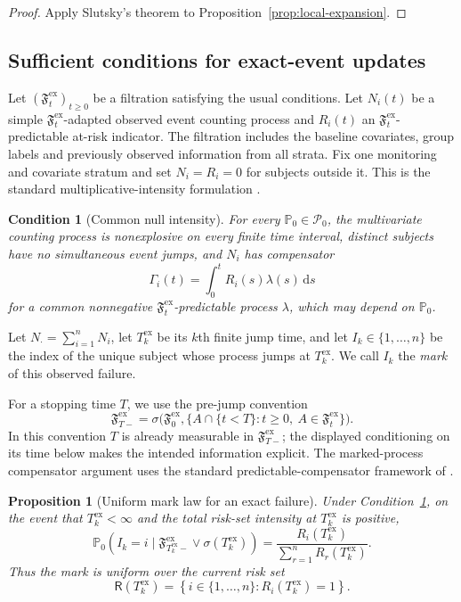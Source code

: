 \documentclass[12pt]{article}
\newtheorem{proposition}[theorem]{Proposition}
\newtheorem{condition}[theorem]{Condition}
\theoremstyle{definition}
\theoremstyle{remark}
\begin{document}
\begin{proof}
Apply Slutsky's theorem to Proposition~\ref{prop:local-expansion}.
\end{proof}

\subsection{Sufficient conditions for exact-event updates}

Let $(\mathfrak F_t^{\mathrm{ex}})_{t\geq0}$ be a filtration satisfying the usual conditions. Let $N_i(t)$ be a simple $\mathfrak F_t^{\mathrm{ex}}$-adapted observed event counting process and $R_i(t)$ an $\mathfrak F_t^{\mathrm{ex}}$-predictable at-risk indicator. The filtration includes the baseline covariates, group labels and previously observed information from all strata. Fix one monitoring and covariate stratum and set $N_i=R_i=0$ for subjects outside it. This is the standard multiplicative-intensity formulation \citep{AndersenEtAl1993,FlemingHarrington1991,TerSchureEtAl2024}.

\begin{condition}[Common null intensity]
\label{ass:common-intensity}
For every $\mathbb P_0\in\mathcal P_0$, the multivariate counting process is nonexplosive on every finite time interval, distinct subjects have no simultaneous event jumps, and $N_i$ has compensator
\[
 \Gamma_i(t)=\int_0^tR_i(s)\lambda(s)\,\mathrm ds
\]
for a common nonnegative $\mathfrak F_t^{\mathrm{ex}}$-predictable process $\lambda$, which may depend on $\mathbb P_0$.
\end{condition}

Let $N_\cdot=\sum_{i=1}^nN_i$, let $T_k^{\mathrm{ex}}$ be its $k$th finite jump time, and let $I_k\in\{1,\ldots,n\}$ be the index of the unique subject whose process jumps at $T_k^{\mathrm{ex}}$. We call $I_k$ the \emph{mark} of this observed failure.

For a stopping time $T$, we use the pre-jump convention
\[
 \mathfrak F^{\mathrm{ex}}_{T-}
 =\sigma\bigl(\mathfrak F^{\mathrm{ex}}_0,
   \{A\cap\{t<T\}:t\geq0,\ A\in\mathfrak F^{\mathrm{ex}}_t\}\bigr).
\]
In this convention $T$ is already measurable in $\mathfrak F^{\mathrm{ex}}_{T-}$; the displayed conditioning on its time below makes the intended information explicit. The marked-process compensator argument uses the standard predictable-compensator framework of \citet{AndersenEtAl1993,FlemingHarrington1991}.

\begin{proposition}[Uniform mark law for an exact failure]
\label{prop:exact-mark}
Under Condition~\ref{ass:common-intensity}, on the event that $T_k^{\mathrm{ex}}<\infty$ and the total risk-set intensity at $T_k^{\mathrm{ex}}$ is positive,
\[
 \mathbb P_0\left(I_k=i\mid
 \mathfrak F_{T_k^{\mathrm{ex}}-}^{\mathrm{ex}}\vee\sigma(T_k^{\mathrm{ex}})\right)
 =\frac{R_i(T_k^{\mathrm{ex}})}{\sum_{r=1}^nR_r(T_k^{\mathrm{ex}})}.
\]
Thus the mark is uniform over the current risk set
\[
 \mathsf R(T_k^{\mathrm{ex}})=\left\{i\in\{1,\ldots,n\}:R_i(T_k^{\mathrm{ex}})=1\right\}.
\]
\end{proposition}
\end{document}
